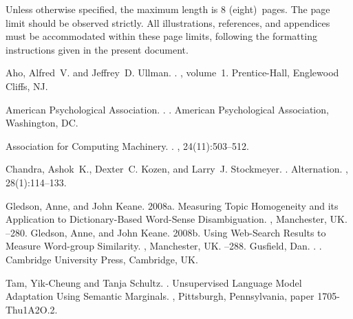 \documentclass[11pt]{article}
\newcommand{\confname}{Machine Translation Summit XIV}
\newcommand{\paperlength}{$8$ (eight)}
\newcommand{\shortpaperlength}{$4$ (four)}
\begin{document}
Unless otherwise specified, the maximum length is \paperlength~pages. 
The page limit should be
observed strictly. All illustrations, references, and appendices must be
accommodated within these page limits, following the formatting instructions
given in the present document.

% 

\begin{thebibliography}{}

Aho, Alfred~V. and Jeffrey~D. Ullman.
.
, volume~1.
\newblock Prentice-{Hall}, Englewood Cliffs, NJ.

{American Psychological Association}.
.
.
\newblock American Psychological Association, Washington, DC.

{Association for Computing Machinery}.
.
, 24(11):503--512.

Chandra, Ashok~K., Dexter~C. Kozen, and Larry~J. Stockmeyer.
.
\newblock Alternation.
,
  28(1):114--133.

Gledson, Anne, and John Keane. 
\newblock 2008a. 
\newblock Measuring Topic Homogeneity and its Application to Dictionary-Based Word-Sense Disambiguation. 
, Manchester, UK.
--280.
Gledson, Anne, and John Keane. 
\newblock 2008b. 
\newblock Using Web-Search Results to Measure Word-group Similarity. , Manchester, UK.
--288.
Gusfield, Dan.
.
.
\newblock Cambridge University Press, Cambridge, UK.

Tam, Yik-Cheung and Tanja Schultz.
. 
\newblock Unsupervised Language Model Adaptation Using
   Semantic Marginals.
, 
Pittsburgh, Pennsylvania, paper 1705-Thu1A2O.2. 


\end{thebibliography}
\end{document}
